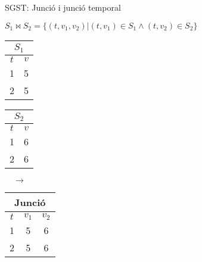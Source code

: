 \begin{frame}{SGST: Junció i junció temporal }
\begin{center}
\begin{definition}[Junció]
 $S_1 \Join S_2 = \{ (t,v_1,v_2) |
  (t,v_1) \in S_1 \wedge (t,v_2) \in S_2  \}$
\end{definition}
{\small
    \begin{tabular}[h]{|c|c|}
    \multicolumn{2}{c}{$S_1$} \\ \hline
      $t$ & $v$ \\\hline
      1 & 5 \\
      2 & 5 \\\hline
    \end{tabular}
    \begin{tabular}[h]{|c|c|}
    \multicolumn{2}{c}{$S_2$} \\ \hline
      $t$ & $v$ \\\hline
      1 & 6 \\
      2 & 6 \\\hline
    \end{tabular}$\quad\longrightarrow\quad$
    \begin{tabular}[h]{|c|c|c|}
    \multicolumn{3}{c}{Junció} \\ \hline
      $t$ & $v_1$ & $v_2$ \\\hline
      1 & 5 & 6  \\
      2 & 5 & 6\\\hline
    \end{tabular}
}



\end{center}
\end{frame}
